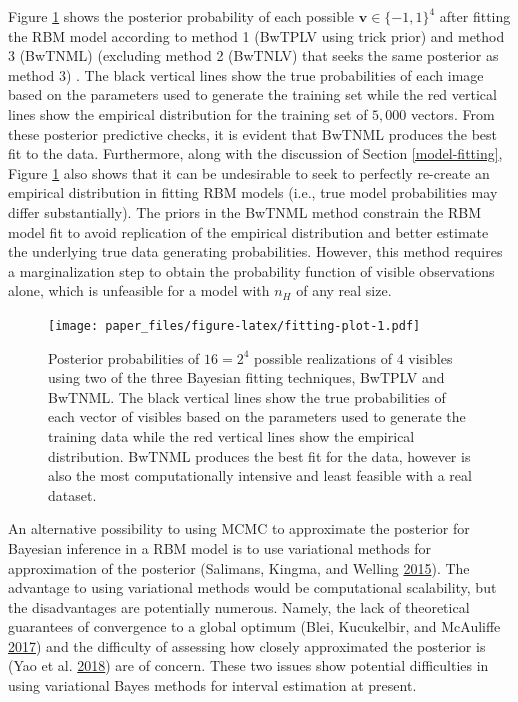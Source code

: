 \documentclass[]{article}
\theoremstyle{definition}
\newcommand{\nh}{{n_{\scriptscriptstyle H}}}
\begin{document}
Figure \ref{fig:fitting-plot} shows the posterior probability of each
possible \(\boldsymbol v \in \{-1,1\}^4\) after fitting the RBM model
according to method 1 (BwTPLV using trick prior) and method 3 (BwTNML)
(excluding method 2 (BwTNLV) that seeks the same posterior as method 3)
. The black vertical lines show the true probabilities of each image
based on the parameters used to generate the training set while the red
vertical lines show the empirical distribution for the training set of
\(5,000\) vectors. From these posterior predictive checks, it is evident
that BwTNML produces the best fit to the data. Furthermore, along with
the discussion of Section \ref{model-fitting}, Figure
\ref{fig:fitting-plot} also shows that it can be undesirable to seek to
perfectly re-create an empirical distribution in fitting RBM models
(i.e., true model probabilities may differ substantially). The priors in
the BwTNML method constrain the RBM model fit to avoid replication of
the empirical distribution and better estimate the underlying true data
generating probabilities. However, this method requires a
marginalization step to obtain the probability function of visible
observations alone, which is unfeasible for a model with \(\nh\) of any
real size.

\par
\begin{figure}
\centering
\texttt{[image: paper\_files/figure-latex/fitting-plot-1.pdf]}
\caption{\label{fig:fitting-plot}Posterior probabilities of \(16 = 2^4\)
possible realizations of \(4\) visibles using two of the three Bayesian
fitting techniques, BwTPLV and BwTNML. The black vertical lines show the
true probabilities of each vector of visibles based on the parameters
used to generate the training data while the red vertical lines show the
empirical distribution. BwTNML produces the best fit for the data,
however is also the most computationally intensive and least feasible
with a real dataset.}
\end{figure}
An alternative possibility to using MCMC to approximate the posterior
for Bayesian inference in a RBM model is to use variational methods for
approximation of the posterior (Salimans, Kingma, and Welling
\protect\hyperlink{ref-salimans2015markov}{2015}). The advantage to
using variational methods would be computational scalability, but the
disadvantages are potentially numerous. Namely, the lack of theoretical
guarantees of convergence to a global optimum (Blei, Kucukelbir, and
McAuliffe \protect\hyperlink{ref-blei2017variational}{2017}) and the
difficulty of assessing how closely approximated the posterior is (Yao
et al. \protect\hyperlink{ref-pmlr-v80-yao18a}{2018}) are of concern.
These two issues show potential difficulties in using variational Bayes
methods for interval estimation at present.
\end{document}
